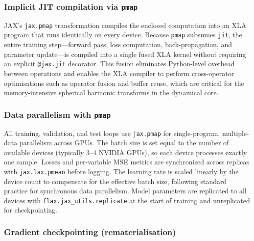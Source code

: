 \subsubsection{Implicit JIT compilation via \texttt{pmap}}

JAX's \texttt{jax.pmap} transformation compiles the enclosed computation into an XLA program that runs identically on every device.
Because \texttt{pmap} subsumes \texttt{jit}, the entire training step---forward pass, loss computation, back-propagation, and parameter update---is compiled into a single fused XLA kernel without requiring an explicit \texttt{@jax.jit} decorator.
This fusion eliminates Python-level overhead between operations and enables the XLA compiler to perform cross-operator optimisations such as operator fusion and buffer reuse, which are critical for the memory-intensive spherical harmonic transforms in the dynamical core.

\subsubsection{Data parallelism with \texttt{pmap}}

All training, validation, and test loops use \texttt{jax.pmap} for single-program, multiple-data parallelism across GPUs.
The batch size is set equal to the number of available devices (typically 3--4 NVIDIA GPUs), so each device processes exactly one sample.
Losses and per-variable MSE metrics are synchronised across replicas with \texttt{jax.lax.pmean} before logging.
The learning rate is scaled linearly by the device count to compensate for the effective batch size, following standard practice for synchronous data parallelism.
Model parameters are replicated to all devices with \texttt{flax.jax\_utils.replicate} at the start of training and unreplicated for checkpointing.

\subsubsection{Gradient checkpointing (rematerialisation)}

